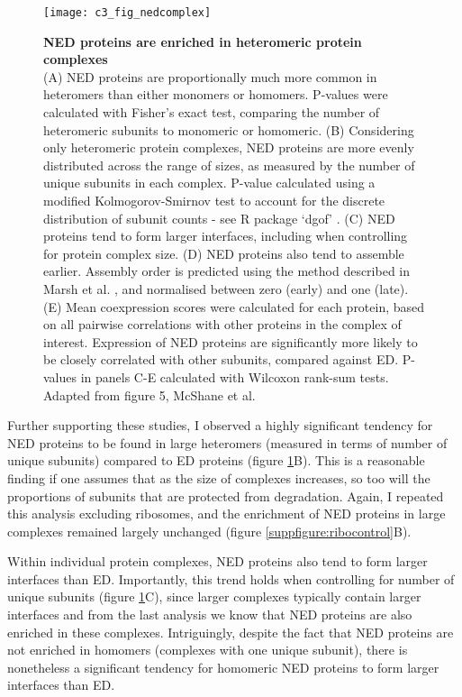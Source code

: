 \documentclass[a4paper,11pt,twoside,openright]{scrbook}
\begin{document}
\begin{figure}
    \texttt{[image: c3\_fig\_nedcomplex]}
    \caption[NED proteins are enriched in heteromeric protein
    complexes]{\sffamily \textbf{NED proteins are enriched in heteromeric
    protein complexes} \\ \small (A) NED proteins are proportionally much more
    common in heteromers than either monomers or homomers. P-values were
    calculated with Fisher's exact test, comparing the number of heteromeric
    subunits to monomeric or homomeric. (B) Considering only heteromeric protein
    complexes, NED proteins are more evenly distributed across the range of
    sizes, as measured by the number of unique subunits in each complex. P-value
    calculated using a modified Kolmogorov-Smirnov test to account for the
    discrete distribution of subunit counts - see R package `dgof'
    \cite{Arnold2011}. (C) NED proteins tend to form larger interfaces,
    including when controlling for protein complex size. (D) NED proteins also
    tend to assemble earlier. Assembly order is predicted using the method
    described in Marsh et al. \cite{Marsh2013}, and normalised between zero
    (early) and one (late). (E) Mean coexpression scores were calculated for
    each protein, based on all pairwise correlations with other proteins in the
    complex of interest. Expression of NED proteins are significantly more
    likely to be closely correlated with other subunits, compared against ED.
    P-values in panels C-E calculated with Wilcoxon rank-sum tests. Adapted from
    figure 5, McShane et al.\cite{McShane2016}}
    \label{figure:nedcomplex}
\end{figure}

Further supporting these studies, I observed a highly significant tendency for
NED proteins to be found in large heteromers (measured in terms of number of
unique subunits) compared to ED proteins (figure \ref{figure:nedcomplex}B). This
is a reasonable finding if one assumes that as the size of complexes increases,
so too will the proportions of subunits that are protected from degradation.
Again, I repeated this analysis excluding ribosomes, and the enrichment of NED
proteins in large complexes remained largely unchanged (figure
\ref{suppfigure:ribocontrol}B).

Within individual protein complexes, NED proteins also tend to form larger
interfaces than ED. Importantly, this trend holds when controlling for number of
unique subunits (figure \ref{figure:nedcomplex}C), since larger complexes
typically contain larger interfaces and from the last analysis we know that NED
proteins are also enriched in these complexes. Intriguingly, despite the fact
that NED proteins are not enriched in homomers (complexes with one unique
subunit), there is nonetheless a significant tendency for homomeric NED proteins
to form larger interfaces than ED.
\end{document}
